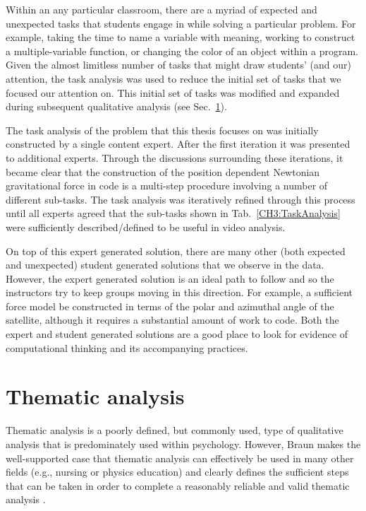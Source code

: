 \documentclass{msuphddissertation}
\begin{document}
\begin{doublespace}
Within an any particular classroom, there are a myriad of expected and unexpected tasks that students engage in while solving a particular problem.  For example, taking the time to name a variable with meaning, working to construct a multiple-variable function, or changing the color of an object within a program.  Given the almost limitless number of tasks that might draw students' (and our) attention, the task analysis was used to reduce the initial set of tasks that we focused our attention on.  This initial set of tasks was modified and expanded during subsequent qualitative analysis (see Sec.~\ref{CH2:Thematic}).

The task analysis of the problem that this thesis focuses on was initially constructed by a single content expert.  After the first iteration it was presented to additional experts.  Through the discussions surrounding these iterations, it became clear that the construction of the position dependent Newtonian gravitational force in code is a multi-step procedure involving a number of different sub-tasks.  The task analysis was iteratively refined through this process until all experts agreed that the sub-tasks shown in Tab.~\ref{CH3:TaskAnalysis} were sufficiently described/defined to be useful in video analysis.
 
On top of this expert generated solution, there are many other (both expected and unexpected) student generated solutions that we observe in the data.  However, the expert generated solution is an ideal path to follow and so the instructors try to keep groups moving in this direction.  For example, a sufficient force model be constructed in terms of the polar and azimuthal angle of the satellite, although it requires a substantial amount of work to code.  Both the expert and student generated solutions are a good place to look for evidence of computational thinking and its accompanying practices.

\section{Thematic analysis}\label{CH2:Thematic}

Thematic analysis is a poorly defined, but commonly used, type of qualitative analysis that is predominately used within psychology.  However, Braun makes the well-supported case that thematic analysis can effectively be used in many other fields (e.g., nursing or physics education) and clearly defines the sufficient steps that can be taken in order to complete a reasonably reliable and valid thematic analysis \cite{Braun2008,Fereda2006,Aronson1995,Vaismoradi2013,Joffe2004,Potter1997,Antaki2002}.


\end{doublespace}
\end{document}
